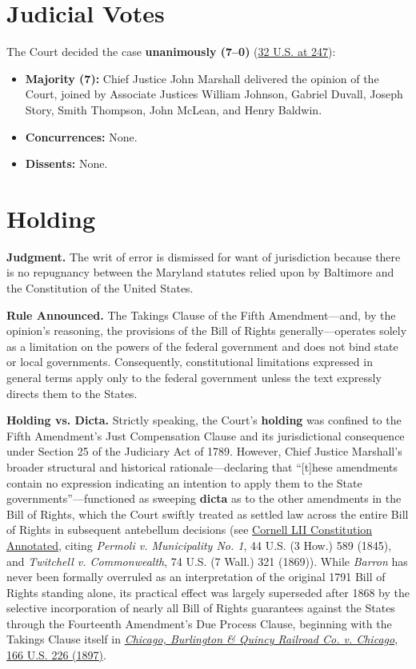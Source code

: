 \documentclass[12pt]{article}
\begin{document}
\section{Judicial Votes}

The Court decided the case \textbf{unanimously (7--0)} (\href{https://supreme.justia.com/cases/federal/us/32/243/}{32 U.S. at 247}):

\begin{itemize}
  \item \textbf{Majority (7):} Chief Justice John Marshall delivered the opinion of the Court, joined by Associate Justices William Johnson, Gabriel Duvall, Joseph Story, Smith Thompson, John McLean, and Henry Baldwin.
  \item \textbf{Concurrences:} None.
  \item \textbf{Dissents:} None.
\end{itemize}

\section{Holding}

\textbf{Judgment.} The writ of error is dismissed for want of jurisdiction because there is no repugnancy between the Maryland statutes relied upon by Baltimore and the Constitution of the United States.

\textbf{Rule Announced.} The Takings Clause of the Fifth Amendment---and, by the opinion's reasoning, the provisions of the Bill of Rights generally---operates solely as a limitation on the powers of the federal government and does not bind state or local governments. Consequently, constitutional limitations expressed in general terms apply only to the federal government unless the text expressly directs them to the States.

\textbf{Holding vs. Dicta.} Strictly speaking, the Court's \textbf{holding} was confined to the Fifth Amendment's Just Compensation Clause and its jurisdictional consequence under Section 25 of the Judiciary Act of 1789. However, Chief Justice Marshall's broader structural and historical rationale---declaring that ``[t]hese amendments contain no expression indicating an intention to apply them to the State governments''---functioned as sweeping \textbf{dicta} as to the other amendments in the Bill of Rights, which the Court swiftly treated as settled law across the entire Bill of Rights in subsequent antebellum decisions (see \href{https://www.law.cornell.edu/constitution-conan/amendment-14/overview-of-incorporation-of-the-bill-of-rights}{Cornell LII Constitution Annotated}, citing \textit{Permoli v. Municipality No. 1}, 44 U.S. (3 How.) 589 (1845), and \textit{Twitchell v. Commonwealth}, 74 U.S. (7 Wall.) 321 (1869)). While \textit{Barron} has never been formally overruled as an interpretation of the original 1791 Bill of Rights standing alone, its practical effect was largely superseded after 1868 by the selective incorporation of nearly all Bill of Rights guarantees against the States through the Fourteenth Amendment's Due Process Clause, beginning with the Takings Clause itself in \href{https://supreme.justia.com/cases/federal/us/166/226/}{\textit{Chicago, Burlington \& Quincy Railroad Co. v. Chicago}, 166 U.S. 226 (1897)}.
\end{document}
